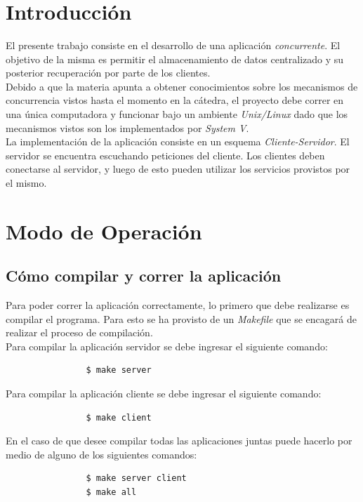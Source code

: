 \documentclass[a4paper,10pt]{article}
\title{  }
\begin{document}
	\maketitle %
	\newpage

	\tableofcontents %
	\newpage

	\section{Introducci\'on}
		El presente trabajo consiste en el desarrollo de una aplicaci\'on {\it concurrente}. El objetivo de la misma
		es permitir el almacenamiento de datos centralizado y su posterior recuperaci\'on por parte de los clientes. \\
		\indent Debido a que la materia apunta a obtener conocimientos sobre los mecanismos de concurrencia vistos hasta el momento en la c\'atedra, 
    el proyecto debe correr en una \'unica computadora y funcionar bajo un ambiente \emph{Unix/Linux} dado que los mecanismos vistos son los 
    implementados por \emph{System V}. \\
		\indent La implementaci\'on de la aplicaci\'on consiste en un esquema \emph{Cliente-Servidor}. El servidor se encuentra escuchando peticiones
		del cliente. Los clientes deben conectarse al servidor, y luego de esto pueden utilizar los servicios provistos por el mismo.
		\vspace{0.5cm}

	\section{Modo de Operaci\'on}

		\subsection {C\'omo compilar y correr la aplicaci\'on}
			Para poder correr la aplicaci\'on correctamente, lo primero que debe realizarse es compilar el programa. Para esto se ha provisto de un
			\emph{Makefile} que se encagar\'a de realizar el proceso de compilaci\'on. \\
			\indent Para compilar la aplicaci\'on servidor se debe ingresar el siguiente comando:
			\begin{verbatim}
				$ make server
			\end{verbatim}
			\indent Para compilar la aplicaci\'on cliente se debe ingresar el siguiente comando:
			\begin{verbatim}
				$ make client
			\end{verbatim}
			\indent En el caso de que desee compilar todas las aplicaciones juntas puede hacerlo por medio de alguno de los siguientes comandos:
			\begin{verbatim}
				$ make server client 
				$ make all
			\end{verbatim}
\end{document}
